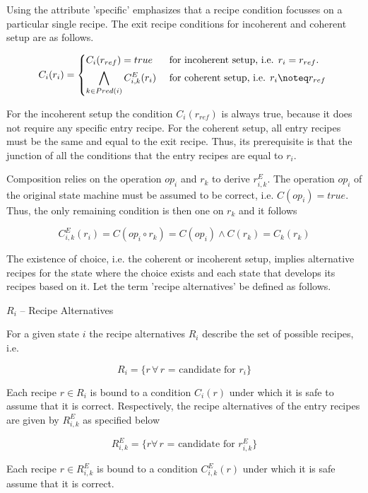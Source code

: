 \documentclass[12pt,a4paper]{scrartcl}
\begin{document}
Using the attribute 'specific' emphasizes that a recipe condition focusses on a
particular single recipe. The exit recipe conditions for incoherent and
coherent setup are as follows.

\begin{equation} \label{eq:choices}
    C_i(r_i) = \begin{dcases*}
               C_i(r_{ref}) = true \
                        & for incoherent setup, i.e. $r_i=r_{ref}$. \\
               \bigwedge_{k\in Pred(i)} C^E_{i,k}(r_i) \
                        & for coherent setup, i.e. $r_i\noteq r_{ref}$ 
             \end{dcases*}
\end{equation}

For the incoherent setup the condition $C_i(r_{ref})$ is always true, because
it does not require any specific entry recipe. For the coherent setup, all
entry recipes must be the same and equal to the exit recipe. Thus, its
prerequisite is that the junction of all the conditions that the entry recipes
are equal to $r_i$.

Composition relies on the operation $op_i$ and $r_k$ to derive $r^E_{i,k}$. The
operation $op_i$ of the original state machine must be assumed to be correct,
i.e.  $C(op_i)=true$.  Thus, the only remaining condition is then one on $r_k$
and it follows

\begin{equation} \label{eq:composition}
    C^E_{i,k}(r_i) = C(op_i \circ r_k) = C(op_i) \wedge C(r_k) = C_k(r_k)
\end{equation}

The existence of choice, i.e. the coherent or incoherent setup, implies
alternative recipes for the state where the choice exists and each state that
develops its recipes based on it. Let the term 'recipe alternatives' be defined
as follows.

\begin{defintion} $R_i$ -- Recipe Alternatives

    For a given state $i$ the recipe alternatives $R_i$ describe the set of
    possible recipes, i.e.

    \begin{equation}
       R_i = \{ r \,\forall\,\mbox{$r$ = candidate for $r_i$} \}
    \end{equation}

    Each recipe $r\in R_i$ is bound to a condition $C_i(r)$ under which it is
    safe to assume that it is correct.  Respectively, the recipe alternatives
    of the entry recipes are given by $R^E_{i,k}$ as specified below

    \begin{equation}
        R^E_{i,k} = \{ r \forall\,\mbox{$r$ = candidate for $r^E_{i,k}$} \}
    \end{equation}

    Each recipe $r\in R^E_{i,k}$ is bound to a condition $C^E_{i,k}(r)$ under
    which it is safe assume that it is correct.  

\end{defintion}
\end{document}

